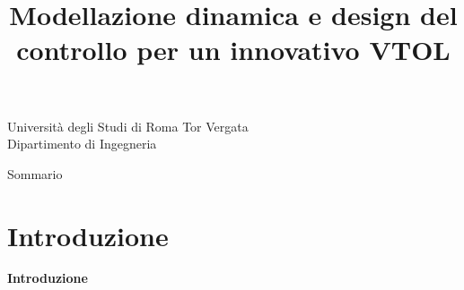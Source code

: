 \documentclass[aspectratio=169]{beamer} %
\title{Modellazione dinamica e design del controllo per un innovativo VTOL}
\author{}
\date{}
\begin{document}
\begin{frame}
    \titlepage
    \begin{center}
        Università degli Studi di Roma Tor Vergata\\
    Dipartimento di Ingegneria
    \end{center}
    
\end{frame}

\begin{frame}{Sommario}
    \tableofcontents
\end{frame}

\section{Introduzione}

\begin{frame}
    \vfill
    \centering
    {\Huge \textbf{Introduzione}}
    \vfill
\end{frame}
\end{document}
